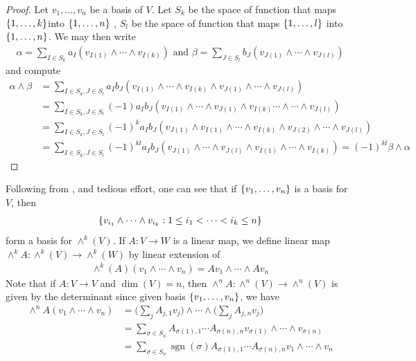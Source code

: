 \documentclass{report}
\begin{document}
\begin{proof}
Let $v_1,\dots ,v_n$ be a basis of $V$. Let $S_k$ be the space of function that maps $\{ 1,\dots ,k \}$into  $\{ 1,\dots,n \}$ , $S_l$ be the space of function that maps  $\{ 1,\dots ,l \}$ into  $\{ 1,\dots ,n \}$. We may then write 
\begin{align*}
\alpha = \sum_{I \in S_k} a_I (v_{I(1)}\wedge \cdots \wedge  v_{I(k)})\text{ and }\beta =\sum_{J \in S_l} b_J (v_{J(1)}\wedge \cdots \wedge v_{J(l)}  )
\end{align*}
and compute 
\begin{align*}
\alpha \wedge \beta &= \sum_{I \in S_k,J\in S_l}a_Ib_J (v_{I(1)}\wedge \cdots \wedge v_{I(k)} \wedge  v_{J(1)} \wedge \cdots  \wedge v_{J(l)}   )\\
&=   \sum_{I \in S_k,J\in S_l}(-1)a_Ib_J (v_{I(1)}\wedge \cdots \wedge   v_{J(1)} \wedge  v_{I(k)}\cdots\wedge \cdots  \wedge v_{J(l)}   )   \\
&=  \sum_{I \in S_k,J\in S_l}(-1)^ka_Ib_J (v_{J(1)}\wedge v_{I(1)}\wedge  \cdots \wedge    v_{I(k)} \wedge  v_{J(2)} \wedge \cdots  \wedge v_{J(l)}   )   \\
  &=\sum_{I \in S_k,J\in S_l}(-1)^{kl}a_Ib_J (v_{J(1)}\wedge \cdots \wedge  v_{J(l)}\wedge v_{I(1)} \wedge   \cdots \wedge   v_{I(k)})= (-1)^{kl}\beta \wedge  \alpha  
\end{align*}
\end{proof}
\begin{mdframed}
Following from ,  and tedious effort, one can see that if $\{ v_1,\dots ,v_n \}$ is a basis for $V$, then 
 \begin{align*}
\{ v_{i_1}\wedge  \cdots \wedge  v_{i_k}:1\leq i_1< \cdots < i_k\leq n   \}
\end{align*}
form a basis for $\wedge^k(V)$. If $A:V\rightarrow W$ is a linear map, we define linear map $\wedge^k A:\wedge^k (V)\rightarrow \wedge^k (W) $ by linear extension of 
\begin{align*}
\wedge^k(A)(v_1\wedge  \cdots \wedge   v_n)=Av_1 \wedge  \cdots \wedge  Av_n  
\end{align*}
Note that if  $A:V\rightarrow V$ and $\operatorname{dim}(V)=n$, then $\wedge ^nA: \wedge^n (V)\rightarrow \wedge ^n(V)$ is given by the determinant since given basis  $\{ v_1,\dots ,v_n \}$, we have 
\begin{align*}
\wedge^nA(v_1 \wedge  \cdots \wedge  v_n   )&=\Big(\sum_j A_{j,1}v_j\Big)\wedge  \cdots \wedge \Big(\sum_j A_{j,n}v_j\Big)    \\
&=\sum_{\sigma \in S_n} A_{\sigma (1),1}\cdots A_{\sigma (n),n}v_{\sigma (1)}\wedge  \cdots \wedge  v_{\sigma(n)}   \\
&=\sum_{\sigma \in S_n}\operatorname{sgn}(\sigma)A_{\sigma(1),1}\cdots A_{\sigma(n),n}v_1\wedge  \cdots \wedge  v_n
\end{align*}
\end{mdframed}
\end{document}
